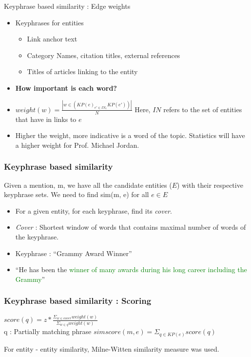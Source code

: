 \begin{frame}{Keyphrase based similarity : Edge weights}
\begin{itemize}  
\item Keyphrases for entities
  \begin{itemize}
    \item Link anchor text
    \item Category Names, citation titles, external references
    \item Titles of articles linking to the entity
  \end{itemize}
\item \textbf{How important is each word?}
\item $ weight(w) = \frac{|w \in (KP(e)_{e'\in IN_e}KP(e'))|}{N} $
Here, $IN$ refers to the set of entities that have in links to $e$
\item Higher the weight, more indicative is a word of the topic. Statistics will have a higher weight for Prof. Michael Jordan.
\end{itemize}
\end{frame}

\begin{frame}
 \frametitle{Keyphrase based similarity}
 Given a mention, m, we have all the candidate entities ($E$) with their respective keyphrase sets.
 We need to find sim(m, e) for all $e \in E$
 \begin{itemize}  
  \item For a given entity, for each keyphrase, find its \emph{cover}.  \medskip
  \item \emph{Cover} : Shortest window of words that contains maximal number of words of the keyphrase. \medskip
  \item Keyphrase : ``Grammy Award Winner'' \medskip
  \item ``He has been the  \textcolor{green}{winner of many awards during his long career including the Grammy}''  \medskip
\end{itemize} 
\end{frame}


\begin{frame}
 \frametitle{Keyphrase based similarity : Scoring}
  \begin{center}
  $score(q) = z * \frac{\Sigma_{w \in cover} weight(w)}{\Sigma_{w \in q} weight(w)}$\\ \bigskip
  q : Partially matching phrase
  $simscore(m, e) = \Sigma_{q \in KP(e)} score(q)$
  \end{center}
  For entity - entity similarity, Milne-Witten similarity measure was used.
 \end{frame}

